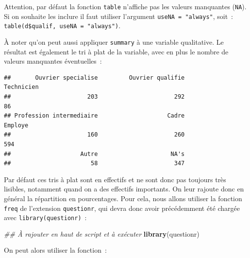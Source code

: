 \documentclass[12pt,]{book}
\makeatletter
\newenvironment{Shaded}{\begin{snugshade}}{\end{snugshade}}
\newcommand{\CommentTok}[1]{\textcolor[rgb]{0.37,0.37,0.37}{\textit{#1}}}
\newcommand{\KeywordTok}[1]{\textcolor[rgb]{0.27,0.27,0.27}{\textbf{#1}}}
\newcommand{\NormalTok}[1]{#1}
\newcommand{\OperatorTok}[1]{\textcolor[rgb]{0.43,0.43,0.43}{\textbf{#1}}}
\newenvironment{kframe}{%
\medskip{}
\setlength{\fboxsep}{.8em}
 \def\at@end@of@kframe{}%
 \ifinner\ifhmode%
  \def\at@end@of@kframe{\end{minipage}}%
  \begin{minipage}{\columnwidth}%
 \fi\fi%
 \def\FrameCommand##1{\hskip\@totalleftmargin \hskip-\fboxsep
 \colorbox{shadecolor}{##1}\hskip-\fboxsep
     \hskip-\linewidth \hskip-\@totalleftmargin \hskip\columnwidth}%
 \MakeFramed {\advance\hsize-\width
   \@totalleftmargin\z@ \linewidth\hsize
   \@setminipage}}%
 {\par\unskip\endMakeFramed%
 \at@end@of@kframe}
\newenvironment{rmdblock}[1]
  {
  \begin{itemize}
  \renewcommand{\labelitemi}{
    \raisebox{-.7\height}[0pt][0pt]{
      {\setkeys{Gin}{width=3em,keepaspectratio}\texttt{[image: images/\#1]}}
    }
  }
  \setlength{\fboxsep}{1em}
  \begin{kframe}
  \item
  }
  {
  \end{kframe}
  \end{itemize}
  }
\newenvironment{rmdimportant}
  {\begin{rmdblock}{important}}
  {\end{rmdblock}}
\makeatother
\begin{document}
\begin{rmdimportant}
Attention, par défaut la fonction \texttt{table} n'affiche pas les valeurs manquantes (\texttt{NA}). Si on souhaite les inclure il faut utiliser l'argument \texttt{useNA\ =\ "always"}, soit~: \texttt{table(d\$qualif,\ useNA\ =\ "always")}.
\end{rmdimportant}

À noter qu'on peut aussi appliquer \texttt{summary} à une variable qualitative. Le résultat est également le tri à plat de la variable, avec en plus le nombre de valeurs manquantes éventuelles~:

\begin{Shaded}
\end{Shaded}

\begin{verbatim}
##       Ouvrier specialise         Ouvrier qualifie               Technicien 
##                      203                      292                       86 
## Profession intermediaire                    Cadre                  Employe 
##                      160                      260                      594 
##                    Autre                     NA's 
##                       58                      347
\end{verbatim}

Par défaut ces tris à plat sont en effectifs et ne sont donc pas toujours très lisibles, notamment quand on a des effectifs importants. On leur rajoute donc en général la répartition en pourcentages. Pour cela, nous allons utiliser la fonction \texttt{freq} de l'extension \texttt{questionr}, qui devra donc avoir précédemment été chargée avec \texttt{library(questionr)}~:

\begin{Shaded}
\begin{Highlighting}[]
\CommentTok{## À rajouter en haut de script et à exécuter}
\KeywordTok{library}\NormalTok{(questionr)}
\end{Highlighting}
\end{Shaded}

On peut alors utiliser la fonction~:

\begin{Shaded}
\end{Shaded}
\end{document}
